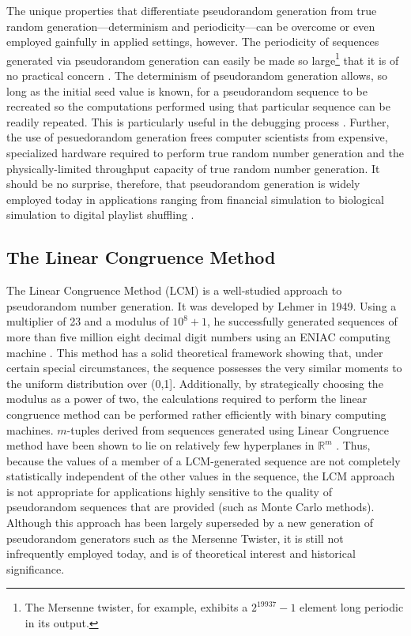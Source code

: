 \documentclass{article}
\theoremstyle{break}
\begin{document}
 The unique properties that differentiate pseudorandom generation from true random generation---determinism and periodicity---can be overcome or even employed gainfully in applied settings, however. The periodicity of sequences generated via pseudorandom generation can easily be made so large\footnote{The Mersenne twister, for example, exhibits a $2^{19937}-1$ element long periodic in its output.} that it is of no practical concern \autocite{matsumoto_mersenne_1998}. The determinism of pseudorandom generation allows, so long as the initial seed value is known, for a pseudorandom sequence to be recreated so the computations performed using that particular sequence can be readily repeated. This is particularly useful in the debugging process \autocite{hull_random_1962}. Further, the use of pesuedorandom generation frees computer scientists from expensive, specialized hardware required to perform true random number generation and the physically-limited throughput capacity of true random number generation. It should be no surprise, therefore, that pseudorandom generation is widely employed today in applications ranging from financial simulation to biological simulation to digital playlist shuffling \autocite{schwartz_biological_2008, dunbar_stochastic_????}.

\subsection{The Linear Congruence Method} The Linear Congruence Method (LCM) is a well-studied approach to pseudorandom number generation. It was developed by Lehmer in 1949. Using a multiplier of 23 and a modulus of $10^{8} + 1$, he successfully generated sequences of more than five million eight decimal digit numbers using an ENIAC computing machine \autocite{hull_random_1962}. This method has a solid theoretical framework showing that, under certain special circumstances, the sequence possesses the very similar moments to the uniform distribution over (0,1]. Additionally, by strategically choosing the modulus as a power of two, the calculations required to perform the linear congruence method can be performed rather efficiently with binary computing machines. $m$-tuples derived from sequences generated using Linear Congruence method have been shown to lie on relatively few hyperplanes in $\mathbb{R}^m$ \autocite{marsaglia_random_1968}. Thus, because the values of a member of a LCM-generated sequence are not completely statistically independent of the other values in the sequence, the LCM approach is not appropriate for applications highly sensitive to the quality of pseudorandom sequences that are provided (such as Monte Carlo methods). Although this approach has been largely superseded by a new generation of pseudorandom generators such as the Mersenne Twister, it is still not infrequently employed today, and is of theoretical interest and historical significance.
\end{document}
